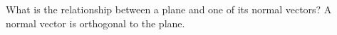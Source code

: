 {What is the relationship between a plane and one of its normal vectors?
}
{A normal vector is orthogonal to the plane.
}


